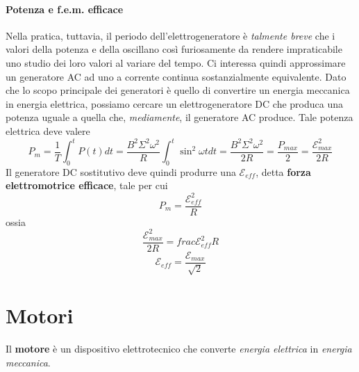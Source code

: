 \paragraph{Potenza e f.e.m. efficace}
Nella pratica, tuttavia, il periodo dell'elettrogeneratore è \textit{talmente breve} che i valori della potenza e della \fem oscillano così furiosamente da rendere impraticabile uno studio dei loro valori al variare del tempo. Ci interessa quindi approssimare un generatore AC ad uno a corrente continua sostanzialmente equivalente. Dato che lo scopo principale dei generatori è quello di convertire un energia meccanica in energia elettrica, possiamo cercare un elettrogeneratore DC che produca una potenza uguale a quella che, \textit{mediamente}, il generatore AC produce. Tale potenza elettrica deve valere
\begin{equation}
	P_m=\frac{1}{T}\int_0^{t}P(t)dt=\frac{B^2\Sigma^2\omega^2}{R}\int_0^{t}\sin^2\omega tdt=\frac{B^2\Sigma^2\omega^2}{2R}=\frac{P_{max}}{2}=\frac{\mathcal{E}_{max}^2}{2R}
\end{equation}
Il generatore DC sostitutivo deve quindi produrre una \fem $\mathcal{E}_{eff}$, detta \textbf{forza elettromotrice efficace}, tale per cui
\begin{equation}
	P_m=\frac{\mathcal{E}^2_{eff}}{R}
\end{equation}
ossia
\begin{equation*}
	\frac{\mathcal{E}_{max}^2}{2R}=frac{\mathcal{E}^2_{eff}}{R}
\end{equation*}
\begin{equation}
	\mathcal{E}_{eff}=\frac{\mathcal{E}_{max}}{\sqrt{2}}
\end{equation}
\section{Motori}
\begin{define}[Motore]
	Il \textbf{motore} è un dispositivo elettrotecnico che converte \textit{energia elettrica} in \textit{energia meccanica}.
\end{define}
